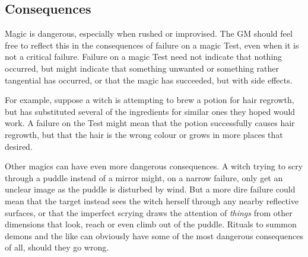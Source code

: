 \subsection{Consequences}

Magic is dangerous, especially when rushed or improvised.
The GM should feel free to reflect this in the consequences of failure on a magic Test, even when it is not a critical failure.
Failure on a magic Test need not indicate that nothing occurred, but might indicate that something unwanted or something rather tangential has occurred, or that the magic has succeeded, but with side effects.

For example, suppose a witch is attempting to brew a potion for hair regrowth, but has substituted several of the ingredients for similar ones they hoped would work.
A failure on the Test might mean that the potion successfully causes hair regrowth, but that the hair is the wrong colour or grows in more places that desired.

Other magics can have even more dangerous consequences.
A witch trying to scry through a puddle instead of a mirror might, on a narrow failure, only get an unclear image as the puddle is disturbed by wind.
But a more dire failure could mean that the target instead sees the witch herself through any nearby reflective surfaces, or that the imperfect scrying draws the attention of \emph{things} from other dimensions that look, reach or even climb out of the puddle.
Rituals to summon demons and the like can obviously have some of the most dangerous consequences of all, should they go wrong.
